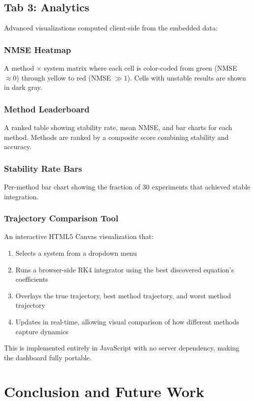 \documentclass[conference]{IEEEtran}
\begin{document}
\subsection{Tab 3: Analytics}
Advanced visualizations computed client-side from the embedded data:

\subsubsection{NMSE Heatmap}
A method $\times$ system matrix where each cell is color-coded from green (NMSE $\approx 0$) through yellow to red (NMSE $\gg 1$). Cells with unstable results are shown in dark gray.

\subsubsection{Method Leaderboard}
A ranked table showing stability rate, mean NMSE, and bar charts for each method. Methods are ranked by a composite score combining stability and accuracy.

\subsubsection{Stability Rate Bars}
Per-method bar chart showing the fraction of 30 experiments that achieved stable integration.

\subsubsection{Trajectory Comparison Tool}
An interactive HTML5 Canvas visualization that:
\begin{enumerate}
    \item Selects a system from a dropdown menu
    \item Runs a browser-side RK4 integrator using the best discovered equation's coefficients
    \item Overlays the true trajectory, best method trajectory, and worst method trajectory
    \item Updates in real-time, allowing visual comparison of how different methods capture dynamics
\end{enumerate}
This is implemented entirely in JavaScript with no server dependency, making the dashboard fully portable.

\section{Conclusion and Future Work}
\label{sec:conclusion}
\end{document}

